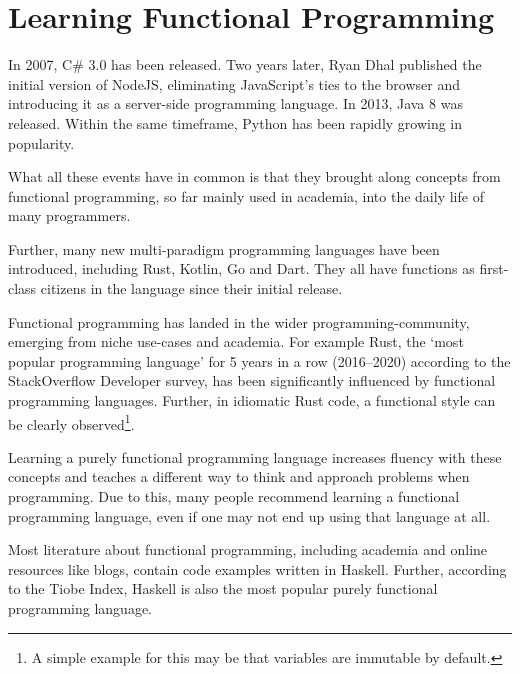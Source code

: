 
\section{Learning Functional Programming}

In 2007, C\# 3.0 has been released. Two years later, Ryan Dhal published the initial version
of NodeJS, eliminating JavaScript's ties to the browser and introducing it as a server-side
programming language. In 2013, Java 8 was released. Within the same timeframe, Python
has been rapidly growing in popularity\autocite{python-popularity}.

What all these events have in common is that they brought along concepts from functional
programming, so far mainly used in academia, into the daily life of many programmers.

Further, many new multi-paradigm programming languages have been introduced,
including Rust, Kotlin, Go and Dart. They all have functions as first-class citizens in
the language since their initial release.

Functional programming has landed in the wider programming-community, emerging from niche use-cases
and academia.
For example Rust, the `most popular programming language' for 5 years in a row (2016--2020)
according to the StackOverflow Developer survey\autocite{rust-loved}, has been significantly
influenced by functional programming languages\autocite{rust-functional}. Further, in idiomatic
Rust code, a functional style can be clearly observed\footnote{A simple example for this may be
that variables are immutable by default.}.

Learning a purely functional programming language increases fluency with these concepts and
teaches a different way to think and approach problems when programming. Due to this, many
people recommend learning a functional programming
language\autocite{blog1-funcprog}\autocite{blog2-funcprog}\autocite{blog3-funcprog}\autocite{blog4-funcprog},
even if one may not end up using that language at all\autocite{quora-funcprog}.

Most literature about functional programming,
including academia and online resources like blogs, contain code examples written in Haskell.
Further, according to the Tiobe Index\autocite{tiobe-index}, Haskell is also the most popular
purely functional programming language\autocite{comparison-functional-languages}.

